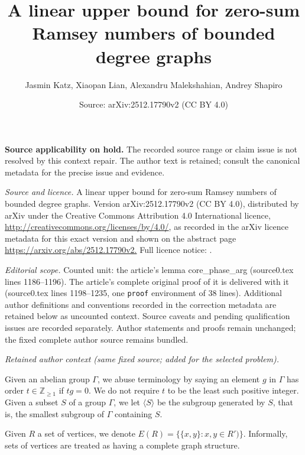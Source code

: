 \documentclass[10pt,a4paper]{amsart}
\title{A linear upper bound for zero-sum Ramsey numbers of bounded degree graphs}
\author{Jasmin Katz, Xiaopan Lian, Alexandru Malekshahian, Andrey Shapiro}
\date{Source: arXiv:2512.17790v2 (CC BY 4.0)}
\begin{document}
\maketitle
\par\medskip\noindent\textbf{Source applicability on hold.} The recorded source range or claim issue is not resolved by this context repair. The author text is retained; consult the canonical metadata for the precise issue and evidence.\par\medskip


{\sloppy \noindent\emph{Source and licence.} A linear upper bound for zero-sum Ramsey numbers of bounded degree graphs. Version arXiv:2512.17790v2 (CC BY 4.0), distributed by arXiv under the Creative Commons Attribution 4.0 International licence, \url{http://creativecommons.org/licenses/by/4.0/}, as recorded in the arXiv licence metadata for this exact version and shown on the abstract page \url{https://arxiv.org/abs/2512.17790v2.} Full licence notice: .\par\smallskip\par}

\noindent\textit{Editorial scope.} Counted unit: the article's lemma core\_phase\_arg (source0.tex lines 1186--1196). The article's complete original proof of it is delivered with it (source0.tex lines 1198--1235, one \texttt{proof} environment of 38 lines). Additional author definitions and conventions recorded in the correction metadata are retained below as uncounted context. Source caveats and pending qualification issues are recorded separately. Author statements and proofs remain unchanged; the fixed complete author source remains bundled.\par\medskip
\par\medskip\noindent\textit{Retained author context (same fixed source; added for the selected problem).}\par
Given an abelian group $\Gamma$, we abuse terminology by saying an element $g$ in $\Gamma$ has order $t\in \mathbb{Z}_{\geq 1}$ if $tg = 0$. We do not require $t$ to be the least such positive integer. Given a subset $S$ of a group $\Gamma$, we let $\langle S \rangle$ be the subgroup generated by $S$, that is, the smallest subgroup of $\Gamma$ containing $S$.    

Given $R$ a set of vertices, we denote $E(R)=\{\{x,y\}:x,y\in R')\}$. Informally, sets of vertices are treated as having a complete graph structure.
\end{document}
